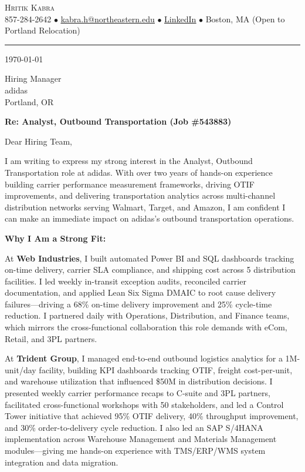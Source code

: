 \documentclass[letterpaper,10pt]{article}
\begin{document}
\begin{center}
    {\Huge \scshape \color{heading} Hritik Kabra} \\ \vspace{2pt}
    \small 857-284-2642 $\bullet$
    \href{mailto:kabra.h@northeastern.edu}{\underline{kabra.h@northeastern.edu}} $\bullet$
    \href{https://www.linkedin.com/in/hritikkabra888}{\underline{LinkedIn}} $\bullet$
    Boston, MA (Open to Portland Relocation)
\end{center}

\vspace{4pt}
{\color{heading}\noindent\rule{\textwidth}{0.8pt}}
\vspace{4pt}

\today

\vspace{4pt}

Hiring Manager\\
adidas\\
Portland, OR

\vspace{4pt}

\textbf{\color{heading}Re: Analyst, Outbound Transportation (Job \#543883)}

\vspace{4pt}

Dear Hiring Team,

I am writing to express my strong interest in the Analyst, Outbound Transportation role at adidas. With over two years of hands-on experience building carrier performance measurement frameworks, driving OTIF improvements, and delivering transportation analytics across multi-channel distribution networks serving Walmart, Target, and Amazon, I am confident I can make an immediate impact on adidas's outbound transportation operations.

\textbf{Why I Am a Strong Fit:}

At \textbf{Web Industries}, I built automated Power BI and SQL dashboards tracking on-time delivery, carrier SLA compliance, and shipping cost across 5 distribution facilities. I led weekly in-transit exception audits, reconciled carrier documentation, and applied Lean Six Sigma DMAIC to root cause delivery failures---driving a 68\% on-time delivery improvement and 25\% cycle-time reduction. I partnered daily with Operations, Distribution, and Finance teams, which mirrors the cross-functional collaboration this role demands with eCom, Retail, and 3PL partners.

At \textbf{Trident Group}, I managed end-to-end outbound logistics analytics for a 1M-unit/day facility, building KPI dashboards tracking OTIF, freight cost-per-unit, and warehouse utilization that influenced \$50M in distribution decisions. I presented weekly carrier performance recaps to C-suite and 3PL partners, facilitated cross-functional workshops with 50 stakeholders, and led a Control Tower initiative that achieved 95\% OTIF delivery, 40\% throughput improvement, and 30\% order-to-delivery cycle reduction. I also led an SAP S/4HANA implementation across Warehouse Management and Materials Management modules---giving me hands-on experience with TMS/ERP/WMS system integration and data migration.
\end{document}
